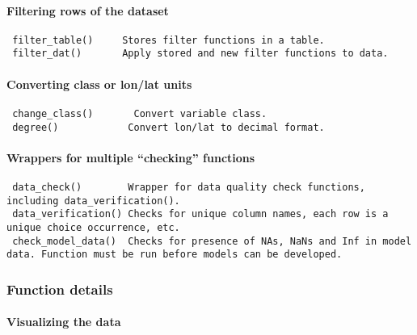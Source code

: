 \documentclass[
]{article}
\begin{document}
\hypertarget{filtering-rows-of-the-dataset}{%
\paragraph{Filtering rows of the dataset}\label{filtering-rows-of-the-dataset}}

\begin{verbatim}
 filter_table()     Stores filter functions in a table.     
 filter_dat()       Apply stored and new filter functions to data.
\end{verbatim}

\hypertarget{converting-class-or-lonlat-units}{%
\paragraph{Converting class or lon/lat units}\label{converting-class-or-lonlat-units}}

\begin{verbatim}
 change_class()       Convert variable class.
 degree()            Convert lon/lat to decimal format.
\end{verbatim}

\hypertarget{wrappers-for-multiple-checking-functions}{%
\paragraph{Wrappers for multiple ``checking'' functions}\label{wrappers-for-multiple-checking-functions}}

\begin{verbatim}
 data_check()        Wrapper for data quality check functions, including data_verification().
 data_verification() Checks for unique column names, each row is a unique choice occurrence, etc.
 check_model_data()  Checks for presence of NAs, NaNs and Inf in model data. Function must be run before models can be developed.
\end{verbatim}

\hypertarget{function-details-3}{%
\subsubsection{Function details}\label{function-details-3}}

\hypertarget{visualizing-the-data-1}{%
\paragraph{Visualizing the data}\label{visualizing-the-data-1}}
\end{document}
